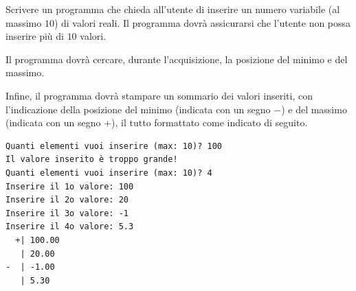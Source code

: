 \begin{Exercise}[label={ex:massimo}]
  Scrivere un programma che chieda all'utente di inserire un numero variabile (al massimo $10$) di valori reali. Il programma dovr\`a assicurarsi che l'utente non possa inserire pi\`u di $10$ valori.

  Il programma dovr\`a cercare, durante l'acquisizione, la posizione del minimo e del massimo.

  Infine, il programma dovr\`a stampare un sommario dei valori inseriti, con l'indicazione della posizione del minimo (indicata con un segno $-$) e del massimo (indicata con un segno $+$), il tutto formattato come indicato di seguito.

\begin{lstlisting}[style=console]
Quanti elementi vuoi inserire (max: 10)? 100
Il valore inserito è troppo grande!
Quanti elementi vuoi inserire (max: 10)? 4
Inserire il 1o valore: 100
Inserire il 2o valore: 20
Inserire il 3o valore: -1
Inserire il 4o valore: 5.3
  +| 100.00
   | 20.00
-  | -1.00
   | 5.30
\end{lstlisting}
\end{Exercise}

\begin{Answer}[ref={ex:massimo}]
  
\end{Answer}
